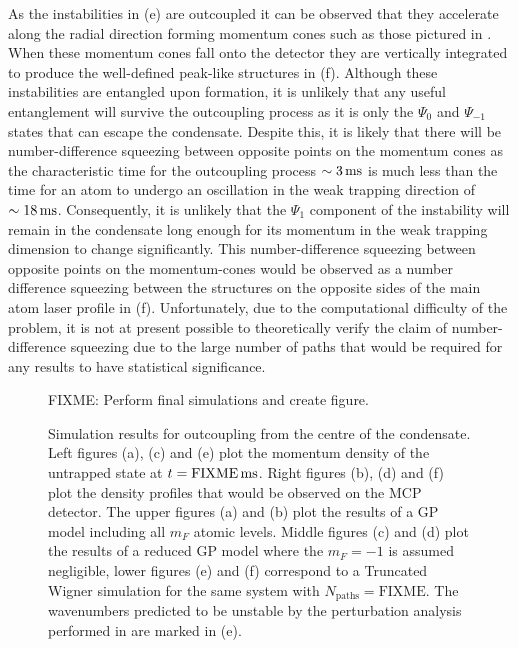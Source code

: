 As the instabilities in (e) are outcoupled it can be observed that they accelerate along the radial direction forming momentum cones such as those pictured in . When these momentum cones fall onto the detector they are vertically integrated to produce the well-defined peak-like structures in (f). Although these instabilities are entangled upon formation, it is unlikely that any useful entanglement will survive the outcoupling process as it is only the $\Psi_0$ and $\Psi_{-1}$ states that can escape the condensate. Despite this, it is likely that there will be number-difference squeezing between opposite points on the momentum cones as the characteristic time for the outcoupling process $\sim \unit[3]{ms}$ is much less than the time for an atom to undergo an oscillation in the weak trapping direction of $\sim \unit[18]{ms}$. Consequently, it is unlikely that the $\Psi_1$ component of the instability will remain in the condensate long enough for its momentum in the weak trapping dimension to change significantly. This number-difference squeezing between opposite points on the momentum-cones would be observed as a number difference squeezing between the structures on the opposite sides of the main atom laser profile in (f). Unfortunately, due to the computational difficulty of the problem, it is not at present possible to theoretically verify the claim of number-difference squeezing due to the large number of paths that would be required for any results to have statistical significance.

\begin{figure}
    \centering
    FIXME: Perform final simulations and create figure.
    \caption{\label{Peaks:TheoryZeroDetuningResults} Simulation results for outcoupling from the centre of the condensate. Left figures (a), (c) and (e) plot the momentum density of the untrapped state at $t=\unit[\text{FIXME}]{ms}$. Right figures (b), (d) and (f) plot the density profiles that would be observed on the MCP detector. The upper figures (a) and (b) plot the results of a GP model including all $m_F$ atomic levels. Middle figures (c) and (d) plot the results of a reduced GP model where the $m_F=-1$ is assumed negligible, lower figures (e) and (f) correspond to a Truncated Wigner simulation for the same system with $N_\text{paths} = \text{FIXME}$. The wavenumbers predicted to be unstable by the perturbation analysis performed in  are marked in (e).}
\end{figure}

